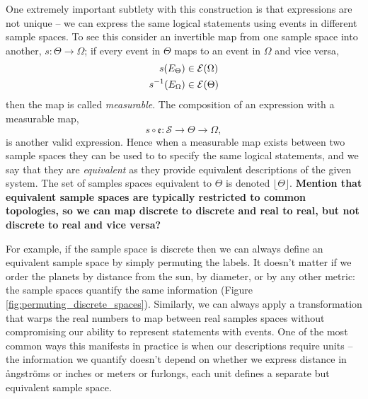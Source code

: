 One extremely important subtlety with this construction is that expressions are 
not unique -- we can express the same logical statements using events in different 
sample spaces.  To see this consider an invertible map from one sample space 
into another, $s : \Theta \rightarrow \Omega$; if every event in $\Theta$ maps 
to an event in  $\Omega$ and vice versa,
%
\begin{align*}
s \! \left( E_{\Theta} \right) &\in  \mathcal{E} \! \left( \Omega \right) 
\\
s^{-1} \! \left( E_{\Omega} \right) &\in  \mathcal{E} \! \left( \Theta \right) 
\end{align*}
%
then the map is called \emph{measurable}.  The composition of an expression
with a measurable map,
%
\begin{equation*}
s \circ \mathfrak{e} : \mathcal{S} \rightarrow \Theta \rightarrow \Omega,
\end{equation*}
%
is another valid expression.  Hence when a measurable map exists between 
two sample spaces they can be used to to specify the same logical statements,
and we say that they are \emph{equivalent} as they provide equivalent descriptions 
of the given system.  The set of samples spaces equivalent to $\Theta$ is 
denoted $\lfloor \Theta \rfloor$.  \textbf{Mention that equivalent sample
spaces are typically restricted to common topologies, so we can map
discrete to discrete and real to real, but not discrete to real and vice
versa?}

For example, if the sample space is discrete then we can always define an 
equivalent sample space by simply permuting the labels.  It doesn't matter 
if we order the planets by distance from the sun, by diameter, or by any other 
metric: the sample spaces quantify the same information (Figure
\ref{fig:permuting_discrete_spaces}).   Similarly, we can always apply a 
transformation that warps the real numbers to map between real samples spaces 
without compromising our ability to represent statements with events.  One of 
the most common ways this manifests in practice is when our descriptions require 
units -- the information we quantify doesn't depend on whether we express distance 
in {\aa}ngstr\"{o}ms or inches or meters or furlongs, each unit defines a separate 
but equivalent sample space.

